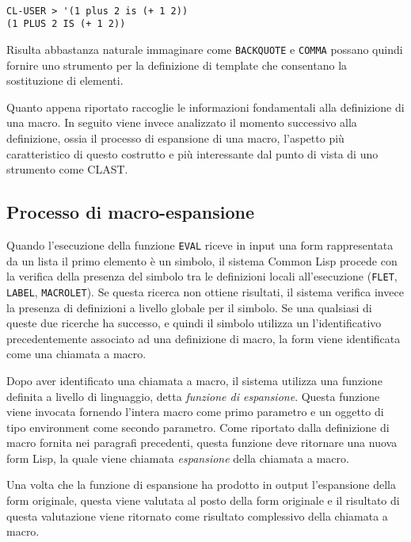 \begin{lstlisting}

CL-USER > '(1 plus 2 is (+ 1 2))
(1 PLUS 2 IS (+ 1 2))

\end{lstlisting}

Risulta abbastanza naturale immaginare come \texttt{BACKQUOTE} e \texttt{COMMA}
possano quindi fornire uno strumento per la definizione di template che
consentano la sostituzione di elementi.

Quanto appena riportato raccoglie le informazioni fondamentali alla definizione
di una macro. In seguito viene invece analizzato il momento successivo alla
definizione, ossia il processo di espansione di una macro, l'aspetto più
caratteristico di questo costrutto e più interessante dal punto di vista di uno
strumento come CLAST.

\subsection{Processo di macro-espansione}
\label{macroexpansion}

Quando l'esecuzione della funzione \texttt{EVAL} riceve in input una form
rappresentata da un lista il primo elemento è un simbolo, il sistema Common Lisp
procede con la verifica della presenza del simbolo tra le definizioni locali
all’esecuzione (\texttt{FLET}, \texttt{LABEL}, \texttt{MACROLET}). Se questa
ricerca non ottiene risultati, il sistema verifica invece la presenza di
definizioni a livello globale per il simbolo. Se una qualsiasi di queste due
ricerche ha successo, e quindi il simbolo utilizza un l’identificativo
precedentemente associato ad una definizione di macro, la form viene
identificata come una chiamata a macro.

Dopo aver identificato una chiamata a macro, il sistema utilizza una funzione
definita a livello di linguaggio, detta \textit{funzione di espansione}. Questa
funzione viene invocata fornendo l’intera macro come primo parametro e un
oggetto di tipo environment come secondo parametro. Come riportato dalla
definizione di macro fornita nei paragrafi precedenti, questa funzione deve
ritornare una nuova form Lisp, la quale viene chiamata \textit{espansione} della
chiamata a macro.

Una volta che la funzione di espansione ha prodotto in output l'espansione della
form originale, questa viene valutata al posto della form originale e il
risultato di questa valutazione viene ritornato come risultato complessivo della
chiamata a macro.

